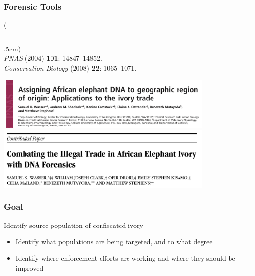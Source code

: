 \documentclass[10pt]{beamer}
\newenvironment{reference}[2]{%
	\begin{textblock*}{\textwidth}(#1,#2)
		\tiny\bgroup\color{gray}}{\egroup\end{textblock*}}
\begin{document}
\begin{frame}[t]
\frametitle{Forensic Tools}
\vspace{0.5cm}
	
	\begin{reference}{4mm}{90mm}
		\rule{1.5cm}{0.25pt}\\
		\emph{PNAS} (2004) \textbf{101}: 14847--14852.\\
		\emph{Conservation Biology} (2008) \textbf{22}: 1065--1071.
	\end{reference}

	\begin{center}
		\includegraphics[width=0.8\textwidth]{figures/wasser1.png}\\
		\vspace{0.25cm}
		\includegraphics[width=0.8\textwidth]{figures/wasser2.png}
	\end{center}
	
\end{frame}


\begin{frame}[t]
\frametitle{Goal}
\vspace{0.5cm}
	
	Identify source population of confiscated ivory\\
	\bigskip
		\begin{itemize}
			\item Identify what populations are being targeted, and to what degree
			\bigskip
			\item Identify where enforcement efforts are working and where they should be improved
		\end{itemize}
\end{frame}
\end{document}
